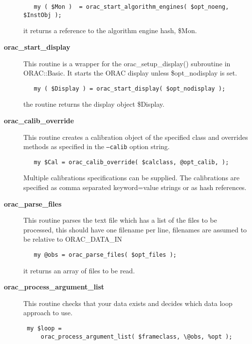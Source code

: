 \begin{description}
\begin{verbatim}
   my ( $Mon )  = orac_start_algorithm_engines( $opt_noeng, $InstObj );
\end{verbatim}


it returns a reference to the algorithm engine hash, \$Mon.


\item[\textbf{orac\_start\_display}] \mbox{}

This routine is a wrapper for the orac\_setup\_display() subroutine in 
ORAC::Basic. It starts the ORAC display unless \$opt\_nodisplay is
set.

\begin{verbatim}
   my ( $Display ) = orac_start_display( $opt_nodisplay );
\end{verbatim}


the routine returns the display object \$Display.


\item[\textbf{orac\_calib\_override}] \mbox{}

This routine creates a calibration object of the specified class and
overrides methods as specified in the \texttt{--calib} option string.

\begin{verbatim}
   my $Cal = orac_calib_override( $calclass, @opt_calib, );
\end{verbatim}


Multiple calibrations specifications can be supplied.
The calibrations are specified as comma separated keyword=value strings
or as hash references.


\item[\textbf{orac\_parse\_files}] \mbox{}

This routine parses the text file which has a list of the files to be
processed, this should have one filename per line, filenames are
assumed to be relative to ORAC\_DATA\_IN

\begin{verbatim}
   my @obs = orac_parse_files( $opt_files );
\end{verbatim}


it returns an array of files to be read.


\item[\textbf{orac\_process\_argument\_list}] \mbox{}

This routine checks that your data exists and decides which data 
loop approach to use.

\begin{verbatim}
 my $loop =  
     orac_process_argument_list( $frameclass, \@obs, %opt );
\end{verbatim}



\end{description}
